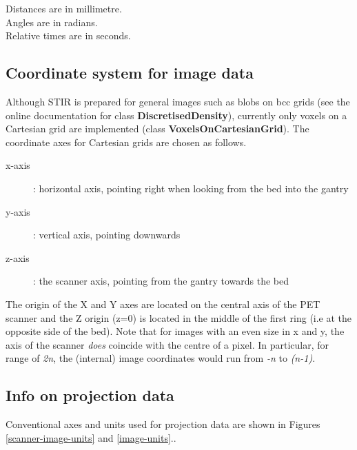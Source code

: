 \documentclass{article}
\begin{document}
Distances are in millimetre.\\
Angles are in radians.\\
Relative times are in seconds.

\subsection{
Coordinate system for image data }

Although STIR is prepared for general images such as blobs on 
bcc grids (see the online documentation for class \textbf{DiscretisedDensity}), 
currently only voxels on a Cartesian grid are implemented (class \textbf{VoxelsOnCartesianGrid}). 
The coordinate axes for Cartesian grids are chosen as follows.
\begin{description}
\item[x-axis] : horizontal axis, pointing right when looking from 
the bed into the gantry
\item[y-axis] : vertical axis, pointing downwards
\item[z-axis] : the scanner axis, pointing from the gantry towards 
the bed
\end{description}
The origin of the X and Y axes are located on the central axis 
of the PET scanner and the Z origin (z=0) is located in the middle 
of the first ring (i.e at the opposite side of the bed). Note 
that for images with an even size in x and y, the axis of the 
scanner \textit{does} coincide with the centre of a pixel. In particular, 
for range of \textit{2n}, the (internal) image coordinates would run 
from \textit{-n} to \textit{(n-1)}.



\subsection{
Info on projection data}

Conventional axes and units used for projection data are shown 
in Figures \ref{scanner-image-units} and \ref{image-units}..
\end{document}
